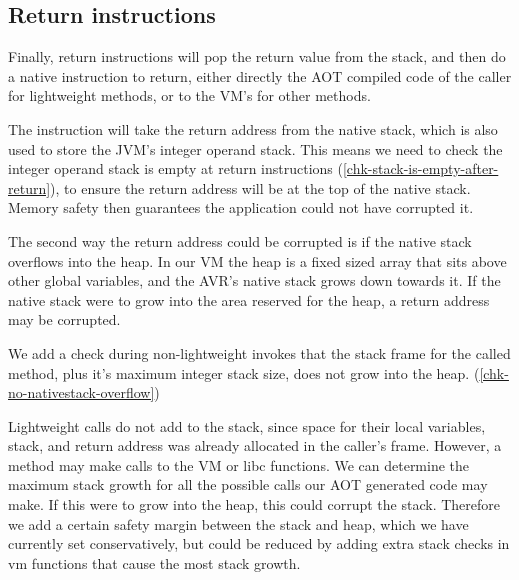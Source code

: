 \subsection{Return instructions}
Finally, return instructions will pop the return value from the stack, and then do a native  instruction to return, either directly the AOT compiled code of the caller for lightweight methods, or to the VM's  for other methods.

The  instruction will take the return address from the native stack, which is also used to store the JVM's integer operand stack. This means we need to check the integer operand stack is empty at return instructions (\ref{chk-stack-is-empty-after-return}), to ensure the return address will be at the top of the native stack. Memory safety then guarantees the application could not have corrupted it.

The second way the return address could be corrupted is if the native stack overflows into the heap. In our VM the heap is a fixed sized array that sits above other global variables, and the AVR's native stack grows down towards it. If the native stack were to grow into the area reserved for the heap, a return address may be corrupted.

We add a check during non-lightweight invokes that the stack frame for the called method, plus it's maximum integer stack size, does not grow into the heap. (\ref{chk-no-nativestack-overflow})

Lightweight calls do not add to the stack, since space for their local variables, stack, and return address was already allocated in the caller's frame. However, a method may make calls to the VM or libc functions. We can determine the maximum stack growth for all the possible calls our AOT generated code may make. If this were to grow into the heap, this could corrupt the stack. Therefore we add a certain safety margin between the stack and heap, which we have currently set conservatively, but could be reduced by adding extra stack checks in vm functions that cause the most stack growth.

